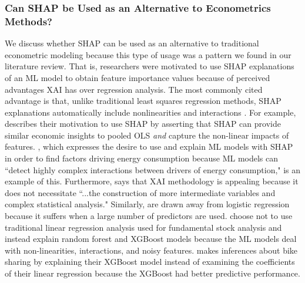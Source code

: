\documentclass[mnsc,blindrev]{informs3}
\begin{document}
\subsubsection{Can SHAP be Used as an Alternative to Econometrics Methods?}
    We discuss whether SHAP can be used as an alternative to traditional econometric modeling because this type of usage was a pattern we found in our literature review. That is, researchers were motivated to use SHAP explanations of an ML model to obtain feature importance values because of perceived advantages XAI has over regression analysis. The most commonly cited advantage is that, unlike traditional least squares regression methods, SHAP explanations automatically include nonlinearities and interactions \cite{hanauer22boosting,berger2023supply,srivastava23energy,banulescu2023practical,li24roles}. For example, \cite{berger2023supply} describes their motivation to use SHAP by asserting that SHAP can provide similar economic insights to pooled OLS \emph{and} capture the non-linear impacts of features. \cite{srivastava23energy}, which expresses the desire to use and explain ML models with SHAP in order to find factors driving energy consumption because ML models can ``detect highly complex interactions between drivers of energy consumption," is an example of this. Furthermore, \cite{zhou23consumption} says that XAI methodology is appealing because it does not necessitate ``...the construction of more intermediate variables and complex statistical analysis." Similarly, \cite{banulescu2023practical} are drawn away from logistic regression because it suffers when a large number of predictors are used. \cite{hanauer22boosting} choose not to use traditional linear regression analysis used for fundamental stock analysis and instead explain random forest and XGBoost models because the ML models deal with non-linearities, interactions, and noisy features. \cite{li24roles} makes inferences about bike sharing by explaining their XGBoost model instead of examining the coefficients of their linear regression because the XGBoost had better predictive performance. 
\end{document}
